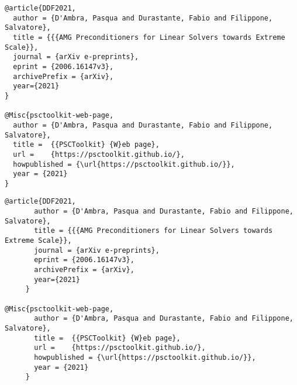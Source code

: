 \ifpdf
\begin{verbatim}
@article{DDF2021,
  author = {D'Ambra, Pasqua and Durastante, Fabio and Filippone, Salvatore},
  title = {{{AMG Preconditioners for Linear Solvers towards Extreme Scale}},
  journal = {arXiv e-preprints},
  eprint = {2006.16147v3},
  archivePrefix = {arXiv},
  year={2021}
}

@Misc{psctoolkit-web-page,
  author = {D'Ambra, Pasqua and Durastante, Fabio and Filippone, Salvatore},
  title =  {{PSCToolkit} {W}eb page},
  url =    {https://psctoolkit.github.io/},
  howpublished = {\url{https://psctoolkit.github.io/}},
  year = {2021}
}
\end{verbatim}
\else
\begin{verbatim}
@article{DDF2021,
       author = {D'Ambra, Pasqua and Durastante, Fabio and Filippone, Salvatore},
       title = {{{AMG Preconditioners for Linear Solvers towards Extreme Scale}},
       journal = {arXiv e-preprints},
       eprint = {2006.16147v3},
       archivePrefix = {arXiv},
       year={2021}
     }

@Misc{psctoolkit-web-page,
       author = {D'Ambra, Pasqua and Durastante, Fabio and Filippone, Salvatore},
       title =  {{PSCToolkit} {W}eb page},
       url =    {https://psctoolkit.github.io/},
       howpublished = {\url{https://psctoolkit.github.io/}},
       year = {2021}
     }
\end{verbatim}
\fi